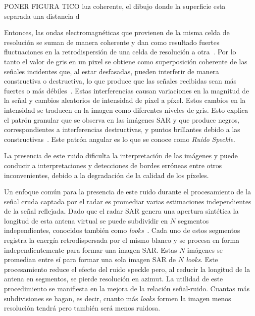 PONER FIGURA TICO luz coherente, el dibujo donde la superficie esta separada una distancia d

Entonces, las ondas electromagnéticas que provienen de la misma celda de resolución se suman de manera coherente y dan como resultado fuertes fluctuaciones en la retrodispersión de una celda de resolución a otra~\cite{oliverquegan98}. Por lo tanto el valor de gris en un pixel se obtiene como superposición coherente de las señales incidentes que, al estar desfasadas, pueden interferir de manera constructiva o destructiva, lo que produce que las señales recibidas sean más fuertes o más débiles~\cite{Shahrezaei2019}. Estas interferencias causan variaciones en la magnitud de la señal y cambios aleatorios de intensidad de píxel a píxel. Estos cambios en la intensidad se traducen en la imagen como diferentes niveles de gris. Esto explica el patrón granular que se observa en las imágenes SAR y que produce negros, correspondientes a interferencias destructivas, y puntos brillantes debido a las constructivas~\cite{Yahya2014}. Este patrón angular es lo que se conoce como \textit{Ruido Speckle}.

La presencia de este ruido dificulta la interpretación de las imágenes y puede conducir a interpretaciones y detecciones de bordes erróneas entre otros inconvenientes, debido a la degradación de la calidad de los píxeles. 

Un enfoque común para la presencia de este ruido durante el procesamiento de la señal cruda captada por el radar es promediar varias estimaciones independientes de la señal reflejada. Dado que el radar SAR genera una apertura sintética la longitud de esta antena virtual se puede subdividir en $N$ segmentos independientes, conocidos también como \textit{looks}~\cite{Lee2009}. Cada uno de estos segmentos registra la energía retrodispersada por el mismo blanco y se procesa en forma independientemente para formar una imagen SAR. Estas $N$ imágenes se promedian entre sí para formar una sola imagen SAR de $N$ \textit{looks}. Este procesamiento reduce el efecto del ruido speckle pero, al reducir la longitud de la antena en segmentos, se pierde resolución en azimut. La utilidad de este procedimiento se manifiesta en la mejora de la relación señal-ruido. Cuantas más subdivisiones se hagan, es decir, cuanto más \textit{looks} formen la imagen menos resolución tendrá pero también será menos ruidosa.

